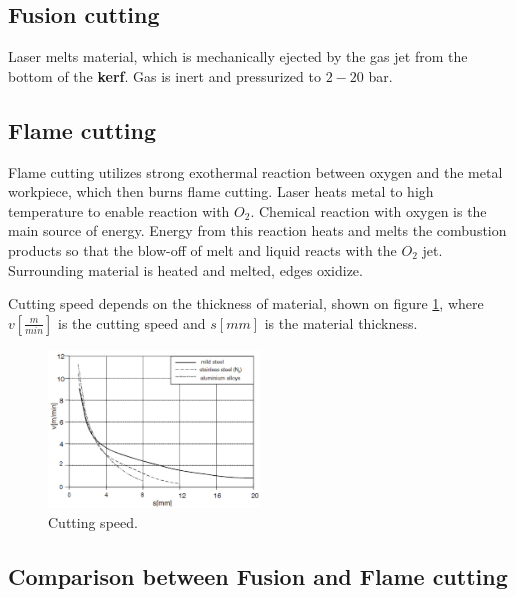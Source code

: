 \subsection{Fusion cutting}
Laser melts material, which is mechanically ejected by the gas jet from the bottom of the \textbf{kerf}. Gas is inert and 
pressurized to $2-20$ bar. 

\subsection{Flame cutting}
Flame cutting utilizes strong exothermal reaction between oxygen and the metal workpiece, which then burns \pd flame cutting.
Laser heats metal to high temperature to enable reaction with $O_2$. Chemical reaction with oxygen is the main source of energy.
Energy from this reaction heats and melts the combustion products so that the blow-off of melt and liquid reacts with the $O_2$ jet.
Surrounding material is heated and melted, edges oxidize.

Cutting speed depends on the thickness of material, shown on figure \ref{fig:cspeed}, where $v \left[\frac{m}{min}\right]$ is the
cutting speed and $s [mm]$ is the material thickness. 
\begin{figure}[h!]
    \centering
    \includegraphics[width=0.5\textwidth]{slike/cspeed.png}
    \caption{Cutting speed. \sln}
    \label{fig:cspeed}
\end{figure}


\subsection{Comparison between Fusion and Flame cutting}

